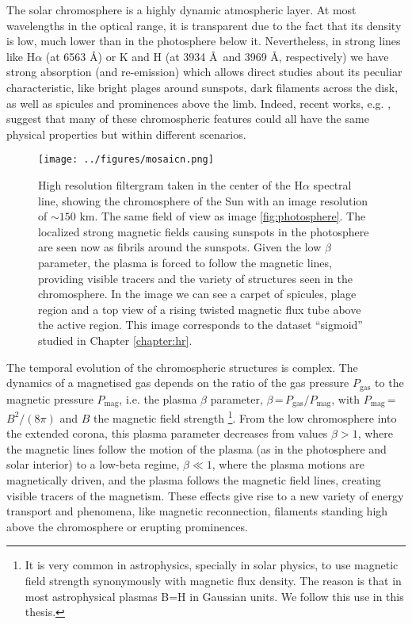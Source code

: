 The solar chromosphere is a highly dynamic atmospheric layer. At most wavelengths in the optical range, it is transparent due to the fact that its density is low, much lower than in the photosphere below it.  Nevertheless, in strong lines like H$\alpha$ (at 6563 \AA) or  K and H (at 3934 \AA\, and 3969 \AA, respectively) we have strong absorption (and re-emission) which allows direct studies about its peculiar characteristic, like bright plages around sunspots, dark filaments across the disk, as well as spicules and prominences above the limb. Indeed, recent works, e.g. \cite{2003A&A...402..361T}, suggest that many of these chromospheric features could all have the same physical properties but within different scenarios. 
\begin{figure}[t]
\begin{center}
\texttt{[image: ../figures/mosaicn.png]}
\caption{High resolution filtergram taken in the center of the H$\alpha$ spectral line, showing the chromosphere of the Sun with an image resolution of $\sim150$ km. The same field of view as image \ref{fig:photosphere}. The localized strong magnetic fields causing sunspots in the photosphere are seen now as fibrils around the sunspots. Given the low $\beta$ parameter, the plasma is forced to follow the magnetic lines, providing visible tracers and the variety of structures seen in the chromosphere. In the image we can see a  carpet of spicules, plage region and a top view of a rising twisted magnetic flux tube above the active region. This image corresponds to the dataset ``sigmoid'' studied in Chapter \ref{chapter:hr}.}
\label{fig:chromosphere}
\end{center}
\end{figure}

The temporal evolution of the chromospheric structures is complex. The dynamics of a magnetised gas depends on  the ratio of the gas pressure  $P_\mathrm{gas}$ to the  magnetic pressure $P_\mathrm{mag}$, i.e. the plasma $\beta$ parameter, $\beta$\,=\,$P_\mathrm{gas}/P_\mathrm{mag}$, with
$P_\mathrm{mag}$\,=\,$B^2/(8\pi)$ and $B$ the magnetic field strength \footnote{It is very common in astrophysics, specially in solar physics, to use magnetic field strength synonymously with magnetic flux density. The reason is that in most astrophysical plasmas B=H in Gaussian units. We follow this use in this thesis.}. From the low chromosphere into the extended corona, this plasma parameter decreases from values $\beta>1$, where the magnetic lines follow the motion of the plasma (as in the photosphere and solar interior) to a
low-beta regime, $\beta\ll1$, where the plasma motions are magnetically driven, and the plasma follows the magnetic field lines, creating visible tracers of the magnetism. These effects give rise to a new variety of energy transport and phenomena, like magnetic reconnection, filaments standing high above the chromosphere or erupting prominences.

